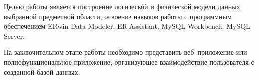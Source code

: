 \Introduction

Целью работы является построение логической и физической модели данных выбранной предметной области, освоение навыков работы с программным обеспечением ERwin Data Modeler, ER Assistant, MySQL Workbench, MySQL Server. 

На заключительном этапе работы необходимо представить веб--приложение или полнофункциональное приложение, организующее взаимодействие пользователя с созданной базой данных.  

%
